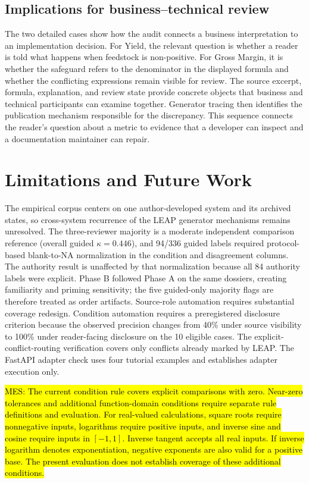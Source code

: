 \documentclass[a4paper,fleqn]{cas-dc}
\newcommand{\mes}[1]{{\sethlcolor{orange}\hl{MES: #1}}}
\begin{document}
\subsection{Implications for business--technical review}
The two detailed cases show how the audit connects a business interpretation to an implementation decision. For Yield, the relevant question is whether a reader is told what happens when feedstock is non-positive. For Gross Margin, it is whether the safeguard refers to the denominator in the displayed formula and whether the conflicting expressions remain visible for review. The source excerpt, formula, explanation, and review state provide concrete objects that business and technical participants can examine together. Generator tracing then identifies the publication mechanism responsible for the discrepancy. This sequence connects the reader's question about a metric to evidence that a developer can inspect and a documentation maintainer can repair.

\section{Limitations and Future Work}
The empirical corpus centers on one author-developed system and its archived states, so cross-system recurrence of the LEAP generator mechanisms remains unresolved. The three-reviewer majority is a moderate independent comparison reference (overall guided $\kappa=0.446$), and 94/336 guided labels required protocol-based blank-to-NA normalization in the condition and disagreement columns. The authority result is unaffected by that normalization because all 84 authority labels were explicit. Phase B followed Phase A on the same dossiers, creating familiarity and priming sensitivity; the five guided-only majority flags are therefore treated as order artifacts. Source-role automation requires substantial coverage redesign. Condition automation requires a preregistered disclosure criterion because the observed precision changes from 40\% under source visibility to 100\% under reader-facing disclosure on the 10 eligible cases. The explicit-conflict-routing verification covers only conflicts already marked by LEAP. The FastAPI adapter check uses four tutorial examples and establishes adapter execution only.

\mes{The current condition rule covers explicit comparisons with zero. Near-zero tolerances and additional function-domain conditions require separate rule definitions and evaluation. For real-valued calculations, square roots require nonnegative inputs, logarithms require positive inputs, and inverse sine and cosine require inputs in $[-1,1]$. Inverse tangent accepts all real inputs. If inverse logarithm denotes exponentiation, negative exponents are also valid for a positive base. The present evaluation does not establish coverage of these additional conditions.}
\end{document}
